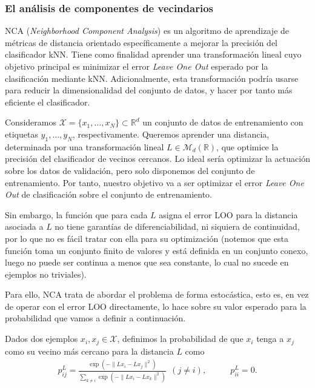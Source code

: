 \subsubsection{El análisis de componentes de vecindarios}

NCA (\emph{Neighborhood Component Analysis}) \cite{nca} es un algoritmo de aprendizaje de métricas de distancia orientado específicamente a mejorar la precisión del clasificador kNN. Tiene como finalidad aprender una transformación lineal cuyo objetivo principal es minimizar el error \emph{Leave One Out} esperado por la clasificación mediante kNN. Adicionalmente, esta transformación podría usarse para reducir la dimensionalidad del conjunto de datos, y hacer por tanto más eficiente el clasificador.
    
Consideramos $\mathcal{X} = \{x_1,\dots,x_N\} \subset \mathbb{R}^d$ un conjunto de datos de entrenamiento con etiquetas $y_1,\dots,y_N$, respectivamente. Queremos aprender una distancia, determinada por una transformación lineal $L \in \mathcal{M}_{d}(\mathbb{R})$, que optimice la precisión del clasificador de vecinos cercanos. Lo ideal sería optimizar la actuación sobre los datos de validación, pero solo disponemos del conjunto de entrenamiento. Por tanto, nuestro objetivo va a ser optimizar el error \emph{Leave One Out} de clasificación sobre el conjunto de entrenamiento.

Sin embargo, la función que para cada $L$ asigna el error LOO para la distancia asociada a $L$ no tiene garantías de diferenciabilidad, ni siquiera de continuidad, por lo que no es fácil tratar con ella para su optimización (notemos que esta función toma un conjunto finito de valores y está definida en un conjunto conexo, luego no puede ser continua a menos que sea constante, lo cual no sucede en ejemplos no triviales).

Para ello, NCA trata de abordar el problema de forma estocástica, esto es, en vez de operar con el error LOO directamente, lo hace sobre su valor esperado para la probabilidad que vamos a definir a continuación.

Dados dos ejemplos $x_i, x_j \in \mathcal{X}$, definimos la probabilidad de que $x_i$ tenga a $x_j$ como su vecino más cercano para la distancia $L$ como
\begin{equation}
    \begin{split}
    p_{ij}^L = \frac{\exp\left( - \|Lx_i - Lx_j \|^2 \right)}{\sum\limits_{k \ne i} \exp\left(-\|Lx_i - Lx_k \|^2\right)}\ \ (j \ne i),  
    \end{split}
    \quad\quad
    \begin{split}
    p_{ii}^L = 0.
    \end{split}
\end{equation}

